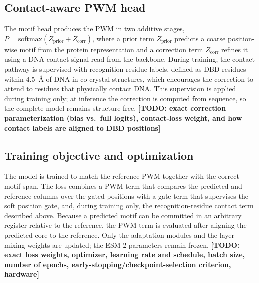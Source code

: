 \documentclass[11pt]{article}
\newcommand{\TODO}[1]{{\color{red}\textbf{[TODO: #1]}}}
\begin{document}
\subsection*{Contact-aware PWM head}
The motif head produces the PWM in two additive stages, $P = \mathrm{softmax}(Z_{\text{prior}}
+ Z_{\text{corr}})$, where a prior term $Z_{\text{prior}}$ predicts a coarse
position-wise motif from the protein representation and a correction term
$Z_{\text{corr}}$ refines it using a DNA-contact signal read from the backbone. During
training, the contact pathway is supervised with recognition-residue labels, defined as
DBD residues within \SI{4.5}{\angstrom} of DNA in co-crystal structures, which
encourages the correction to attend to residues that physically contact DNA. This
supervision is applied during training only; at inference the correction is computed
from sequence, so the complete model remains structure-free.
\TODO{exact correction parameterization (bias vs.\ full logits), contact-loss weight,
and how contact labels are aligned to DBD positions}

\subsection*{Training objective and optimization}
The model is trained to match the reference PWM together with the correct motif span.
The loss combines a PWM term that compares the predicted and reference columns over the
gated positions with a gate term that supervises the soft position gate, and, during
training only, the recognition-residue contact term described above. Because a
predicted motif can be committed in an arbitrary register relative to the reference, the
PWM term is evaluated after aligning the predicted core to the reference. Only the
adaptation modules and the layer-mixing weights are updated; the ESM-2 parameters remain
frozen.
\TODO{exact loss weights, optimizer, learning rate and schedule, batch size, number of
epochs, early-stopping/checkpoint-selection criterion, hardware}
\end{document}
